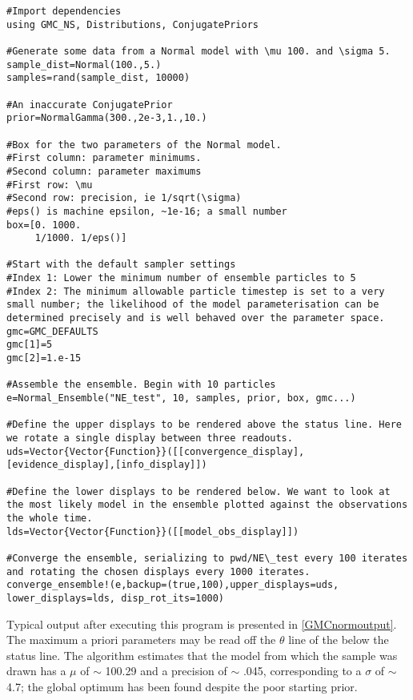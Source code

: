 \begin{verbatim}
#Import dependencies
using GMC_NS, Distributions, ConjugatePriors

#Generate some data from a Normal model with \mu 100. and \sigma 5. 
sample_dist=Normal(100.,5.)
samples=rand(sample_dist, 10000)

#An inaccurate ConjugatePrior
prior=NormalGamma(300.,2e-3,1.,10.) 

#Box for the two parameters of the Normal model.
#First column: parameter minimums.
#Second column: parameter maximums
#First row: \mu
#Second row: precision, ie 1/sqrt(\sigma)
#eps() is machine epsilon, ~1e-16; a small number
box=[0. 1000.
     1/1000. 1/eps()]

#Start with the default sampler settings
#Index 1: Lower the minimum number of ensemble particles to 5
#Index 2: The minimum allowable particle timestep is set to a very small number; the likelihood of the model parameterisation can be determined precisely and is well behaved over the parameter space.
gmc=GMC_DEFAULTS
gmc[1]=5
gmc[2]=1.e-15

#Assemble the ensemble. Begin with 10 particles
e=Normal_Ensemble("NE_test", 10, samples, prior, box, gmc...)

#Define the upper displays to be rendered above the status line. Here we rotate a single display between three readouts.
uds=Vector{Vector{Function}}([[convergence_display],[evidence_display],[info_display]])

#Define the lower displays to be rendered below. We want to look at the most likely model in the ensemble plotted against the observations the whole time.
lds=Vector{Vector{Function}}([[model_obs_display]])

#Converge the ensemble, serializing to pwd/NE\_test every 100 iterates and rotating the chosen displays every 1000 iterates.
converge_ensemble!(e,backup=(true,100),upper_displays=uds, lower_displays=lds, disp_rot_its=1000)
\end{verbatim}

Typical output after executing this program is presented in \autoref{GMCnormoutput}. The maximum a priori parameters may be read off the $\theta$ line of the  below the status line. The algorithm estimates that the model from which the sample was drawn has a $\mu$ of $\sim$ 100.29 and a precision of $\sim$ .045, corresponding to a $\sigma$ of $\sim$ 4.7; the global optimum has been found despite the poor starting prior.

